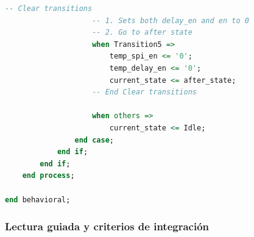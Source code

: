 \documentclass[a4paper,12pt]{article}
\begin{document}
\begin{lstlisting}[language=VHDL,basicstyle=\ttfamily\small,frame=single,caption={oled\_init.vhd}]
                    -- Clear transitions
                    -- 1. Sets both delay_en and en to 0
                    -- 2. Go to after state
                    when Transition5 =>
                        temp_spi_en <= '0';
                        temp_delay_en <= '0';
                        current_state <= after_state;
                    -- End Clear transitions

                    when others =>
                        current_state <= Idle;
                end case;
            end if;
        end if;
    end process;

end behavioral;
\end{lstlisting}

\subsubsection*{Lectura guiada y criterios de integración}
\end{document}
